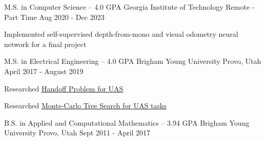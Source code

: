 

\begin{cventries}
  \cventry
    {M.S. in Computer Science -- 4.0 GPA} %
    {Georgia Institute of Technology} %
    {Remote - Part Time} %
    {Aug 2020 - Dec 2023} %
    {
        \begin{cvitems}
            \item{Implemented self-supervised depth-from-mono and visual odometry neural network for a final project}
        \end{cvitems}
    }

  \cventry
    {M.S. in Electrical Engineering -- 4.0 GPA} %
    {Brigham Young University} %
    {Provo, Utah} %
    {April 2017 - August 2019} %
    {
        \begin{cvitems}
            \item{Researched \href{https://www.techrxiv.org/doi/full/10.36227/techrxiv.14869476.v1}{\color{awesome-skyblue}Handoff Problem for UAS}}
            \item{Researched \href{https://link.springer.com/article/10.1007/s42452-021-04583-8}{\color{awesome-skyblue}Monte-Carlo Tree Search for UAS tasks}}
        \end{cvitems}
    }

  \cventry
    {B.S. in Applied and Computational Mathematics -- 3.94 GPA} %
    {Brigham Young University} %
    {Provo, Utah} %
    {Sept 2011 - April 2017} %
    {
    }

\end{cventries}
